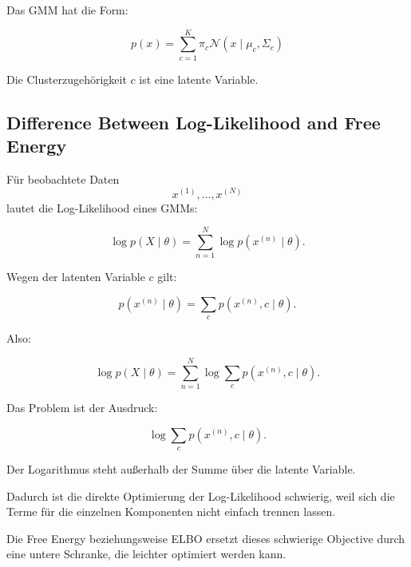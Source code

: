 \documentclass[11pt,a4paper]{scrartcl}
\begin{document}
\begin{answerbox}
    Das GMM hat die Form:

    \[
        \boxed{
            p(x)
            =
            \sum_{c=1}^{K}
            \pi_c
            \mathcal{N}(x\mid \mu_c,\Sigma_c)
        }
    \]

    Die Clusterzugehörigkeit \(c\) ist eine latente Variable.
\end{answerbox}

\subsection{Difference Between Log-Likelihood and Free Energy}

\begin{notebox}
    Für beobachtete Daten
    \[
        x^{(1)},\dots,x^{(N)}
    \]
    lautet die Log-Likelihood eines GMMs:

    \[
        \log p(X\mid \theta)
        =
        \sum_{n=1}^{N}
        \log p(x^{(n)}\mid \theta).
    \]

    Wegen der latenten Variable \(c\) gilt:

    \[
        p(x^{(n)}\mid \theta)
        =
        \sum_{c}
        p(x^{(n)},c\mid \theta).
    \]

    Also:

    \[
        \log p(X\mid \theta)
        =
        \sum_{n=1}^{N}
        \log
        \sum_{c}
        p(x^{(n)},c\mid \theta).
    \]
\end{notebox}

\begin{solutionbox}
    Das Problem ist der Ausdruck:

    \[
        \log
        \sum_c
        p(x^{(n)},c\mid \theta).
    \]

    Der Logarithmus steht außerhalb der Summe über die latente Variable.

    Dadurch ist die direkte Optimierung der Log-Likelihood schwierig, weil sich
    die Terme für die einzelnen Komponenten nicht einfach trennen lassen.

    Die Free Energy beziehungsweise ELBO ersetzt dieses schwierige Objective
    durch eine untere Schranke, die leichter optimiert werden kann.
\end{solutionbox}
\end{document}
